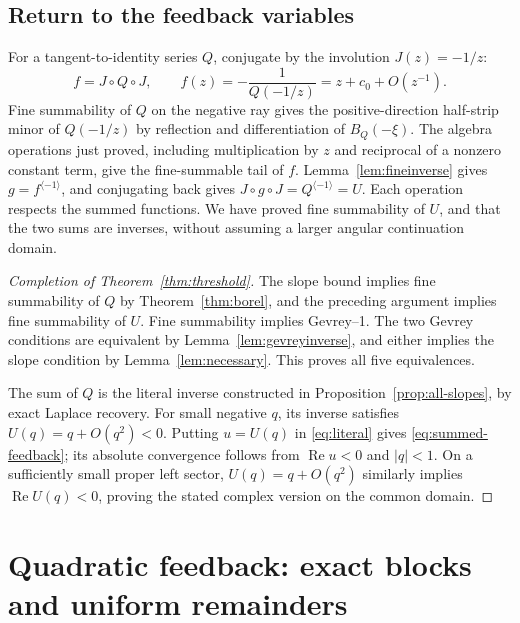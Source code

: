 \documentclass[11pt,a4paper]{article}
\numberwithin{equation}{section}
\theoremstyle{definition}
\theoremstyle{remark}
\newcommand{\Ree}{\operatorname{Re}}
\newcommand{\inv}{\langle-1\rangle}
\begin{document}
\subsection{Return to the feedback variables}
For a tangent-to-identity series $Q$, conjugate by the involution
$J(z)=-1/z$:
\begin{equation}
 f=J\circ Q\circ J,
 \qquad f(z)=-\frac1{Q(-1/z)}=z+c_0+O(z^{-1}).
 \label{eq:conjugation}
\end{equation}
Fine summability of $Q$ on the negative ray gives the positive-direction
half-strip minor of $Q(-1/z)$ by reflection and differentiation of
$B_Q(-\xi)$.  The algebra operations just proved, including multiplication
by $z$ and reciprocal of a nonzero constant term, give the fine-summable
tail of $f$.  Lemma~\ref{lem:fineinverse} gives $g=f^{\inv}$, and
conjugating back gives
$J\circ g\circ J=Q^{\inv}=U$.  Each operation respects the summed
functions.  We have proved fine summability of $U$, and that the two sums
are inverses, without assuming a larger angular continuation domain.

\begin{proof}[Completion of Theorem~\ref{thm:threshold}]
The slope bound implies fine summability of $Q$ by
Theorem~\ref{thm:borel}, and the preceding argument implies fine
summability of $U$.  Fine summability implies Gevrey--1.  The two Gevrey
conditions are equivalent by Lemma~\ref{lem:gevreyinverse}, and either
implies the slope condition by Lemma~\ref{lem:necessary}.
This proves all five equivalences.

The sum of $Q$ is the literal inverse constructed in
Proposition~\ref{prop:all-slopes}, by exact Laplace recovery.  For small
negative $q$, its inverse satisfies $U(q)=q+O(q^2)<0$.
Putting $u=U(q)$ in \eqref{eq:literal} gives
\eqref{eq:summed-feedback}; its absolute convergence follows from
$\Ree u<0$ and $|q|<1$.  On a sufficiently small proper left sector,
$U(q)=q+O(q^2)$ similarly implies $\Ree U(q)<0$, proving the stated
complex version on the common domain.
\end{proof}

\section{Quadratic feedback: exact blocks and uniform remainders}
\label{sec:quadratic}
\end{document}
